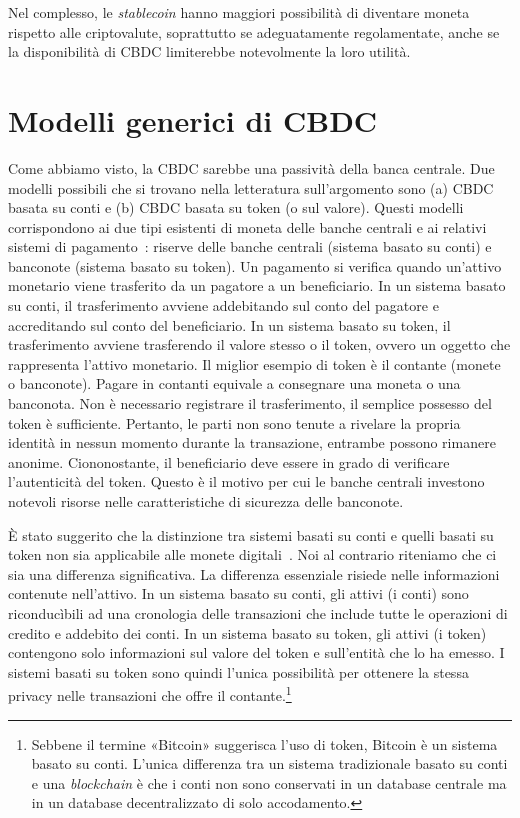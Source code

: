 \documentclass[a4paper]{article}
\begin{document}
Nel complesso, le \textit{stablecoin} hanno maggiori possibilità di
diventare moneta rispetto alle criptovalute, soprattutto se
adeguatamente regolamentate, anche se la disponibilità di CBDC
limiterebbe notevolmente la loro utilità.

\section{Modelli generici di CBDC} \label{3.-modelli-generici-di-cbdc}

Come abbiamo visto, la CBDC sarebbe una passività della banca
centrale. Due modelli possibili che si trovano nella letteratura
sull'argomento sono (a) CBDC basata su conti e (b) CBDC basata su
token (o sul valore). Questi modelli corrispondono ai due tipi
esistenti di moneta delle banche centrali e ai relativi sistemi di
pagamento~\cite[][]{Kahn2009}: riserve delle banche centrali
(sistema basato su conti) e banconote (sistema basato su token). Un
pagamento si verifica quando un'attivo monetario viene trasferito da un
pagatore a un beneficiario. In un sistema basato su conti, il
trasferimento avviene addebitando sul conto del pagatore e
accreditando sul conto del beneficiario. In un sistema basato su
token, il trasferimento avviene trasferendo il valore stesso o il
token, ovvero un oggetto che rappresenta l'attivo monetario. Il miglior
esempio di token è il contante (monete o banconote). Pagare in contanti
equivale a consegnare una moneta o una banconota. Non è necessario
registrare il trasferimento, il semplice possesso del token è
sufficiente. Pertanto, le parti non sono tenute a rivelare la propria
identità in nessun momento durante la transazione, entrambe possono
rimanere anonime. Ciononostante, il beneficiario deve essere in grado di
verificare l'autenticità del token. Questo è il motivo per cui le
banche centrali investono notevoli risorse nelle caratteristiche di
sicurezza delle banconote.

È stato suggerito che la distinzione tra sistemi basati su conti e
quelli basati su token non sia applicabile alle monete digitali~\cite[][]{Garratt}.
Noi al contrario riteniamo che ci sia una differenza significativa. La
differenza essenziale risiede nelle informazioni contenute nell'attivo.
In un sistema basato su conti, gli attivi (i conti) sono riconducìbili
ad una cronologia delle transazioni che include tutte le operazioni di
credito e addebito dei conti. In un sistema basato su token, gli attivi
(i token) contengono solo informazioni sul valore del token e
sull'entità che lo ha emesso. I sistemi basati su token sono quindi
l'unica possibilità per ottenere la stessa privacy nelle transazioni che
offre il contante.\footnote{Sebbene il termine «Bitcoin» suggerisca
l'uso di token, Bitcoin è un sistema basato su conti. L'unica differenza
tra un sistema tradizionale basato su conti e una \textit{blockchain} è
che i conti non sono conservati in un database centrale ma in un
database decentralizzato di solo accodamento.}
\end{document}

